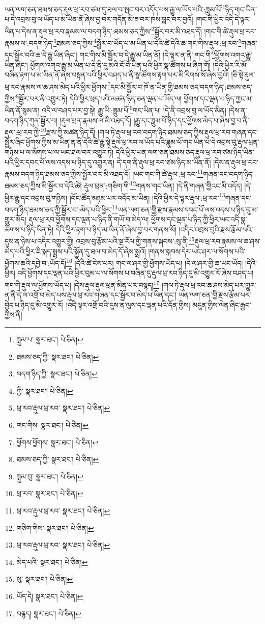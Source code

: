 ཡན་ལག་ཅན་ཐམས་ཅད་རྡུལ་ཕྲ་རབ་ཙམ་དུ་ཐལ་བ་སྤང་བར་འདོད་པས་རྒྱུ་ལ་ཡོད་པའི་:ཟླུམ་པོ་\footnote{ཟླུམ་པ་  སྣར་ཐང་།  པེ་ཅིན། }ཉིད་གང་ཡིན་པ་དེ་འབྲས་བུ་ལ་ཡོད་པ་མ་ཡིན་ནོ་ཞེས་བྱ་བར་གདོན་མི་ཟ་བར་ཁས་བླང་བར་བྱའོ། །གང་གི་ཕྱིར་འདི་དེ་ལྟར་ཡིན་པ་དེས་ན་རྡུལ་ཕྲ་རབ་རྣམས་ལ་བདག་ཉིད་:ཐམས་ཅད་ཀྱིས་\footnote{ཐམས་ཅད་ཀྱི་  སྣར་ཐང་།  པེ་ཅིན། }སྦྱོར་བར་མི་འཐད་དོ། །གང་གི་ཚེ་རྡུལ་ཕྲ་རབ་རྣམས་ལ་:བདག་ཉིད་\footnote{བདག་ཉིད་ཀྱི་  སྣར་ཐང་།  པེ་ཅིན། }ཐམས་ཅད་ཀྱིས་\footnote{ཀྱི་  སྣར་ཐང་།  པེ་ཅིན། }སྦྱོར་བ་ཡོད་པ་མ་ཡིན་པ་དེའི་ཚེ་དེའི་ཆ་གང་གིས་རྡུལ་:ཕྲ་རབ་\footnote{ཕྲ་རབ་རྡུལ་ཕྲ་རབ་  སྣར་ཐང་།  པེ་ཅིན། }གཞན་དང་སྦྱོར་བའི་ཆ་དེ་རྒྱུ་ཡིན་ཞིང་། གང་གིས་མི་སྦྱོར་བ་དེ་རྒྱུ་མ་ཡིན་ནོ། །དེ་ལྟར་ན་ནི་:གང་གི་\footnote{གང་གིས་  སྣར་ཐང་།  པེ་ཅིན། }ཕྱོགས་འགའ་རྒྱུ་ཡིན་ཞིང་། ཕྱོགས་འགའ་རྒྱུ་མ་ཡིན་པ་དེ་ནི་དུ་མའི་ངོ་བོ་ཡིན་པའི་ཕྱིར་སྣ་ཚོགས་པ་ཞིག་གོ། །དེའི་ཕྱིར་རི་མོ་བཞིན་རྟག་པ་མ་ཡིན་ནོ་ཞེས་བསྟན་པའི་ཕྱིར་བཤད་པ་ནི་སྣ་ཚོགས་རྟག་པར་མི་རིགས་སོ་ཞེས་བྱའོ། །ཅི་སྟེ་རྡུལ་ཕྲ་རབ་རྣམས་ལ་ཆ་ཤས་མེད་པའི་ཕྱིར་ཕྱོགས་\footnote{ཕྱོགས་ཕྱོགས་  སྣར་ཐང་།  པེ་ཅིན། }དང་མི་སྦྱོར་བ་ཁོ་ན་ཡིན་གྱི་ཐམས་ཅད་བདག་ཉིད་:ཐམས་ཅད་ཀྱིས་\footnote{ཐམས་ཅད་ཀྱི་  སྣར་ཐང་།  པེ་ཅིན། }སྦྱོར་བར་ནི་འགྱུར་ཏེ། དེའི་ཕྱིར་ཕྲད་པའི་མཚན་ཉིད་ཅན་ལྡན་པ་ཡོད་ལ། ཕྱོགས་དང་ལྡན་པ་ཉིད་ཀྱང་མ་ཡིན་ནོ་སྙམ་ན། འདི་ལ་བཤད་པར་བྱ་སྟེ། རྒྱུ་ཡི་:ཟླུམ་པོ་\footnote{ཟླུམ་བུ་  སྣར་ཐང་།  པེ་ཅིན། }གང་ཡིན་པ། །དེ་ནི་འབྲས་བུ་ལ་ཡོད་མིན། །དེས་ན་བདག་ཉིད་ཀུན་སྦྱོར་བ། །རྡུལ་ཕྲན་རྣམས་ལ་མི་འཐད་དོ། །རྒྱུ་དང་ཟླུམ་པོ་ཉིད་དང་ཕྱོགས་མེད་པ་ཞེས་བྱ་བ་ནི་རྡུལ་:ཕྲ་རབ་ཀྱི་\footnote{ཕྲ་རབ་  སྣར་ཐང་།  པེ་ཅིན། }རྫས་ཀྱི་མཚན་ཉིད་དོ། །གལ་ཏེ་རྡུལ་ཕྲ་རབ་བདག་ཉིད་ཐམས་ཅད་ཀྱིས་རྡུལ་ཕྲ་རབ་གཞན་དང་སྦྱོར་ཞིང་ཕྱོགས་ཀྱིས་མ་ཡིན་ན་ནི་དེའི་ཚེ་རྒྱུ་སྟེ་རྡུལ་ཕྲ་རབ་ལ་ཡོད་པའི་ཟླུམ་པོ་གང་ཡིན་པ་དེ་འབྲས་བུ་རྡུལ་ཕྲན་གཉིས་པ་ལ་སོགས་པ་ལ་ཡང་ཐལ་བར་འགྱུར་ཏེ། དེའི་ཕྱིར་ཡན་ལག་ཅན་ཐམས་ཅད་རྡུལ་ཕྲ་རབ་ཙམ་ཉིད་ཡིན་པའི་ཕྱིར་དབང་པོ་ལས་འདས་པ་ཉིད་དུ་འགྱུར་ན། དེ་དག་ནི་རྡུལ་ཕྲ་རབ་ཙམ་ཉིད་མ་ཡིན་ནོ། །དེས་ན་རྡུལ་ཕྲ་རབ་རྣམས་བདག་ཉིད་ཐམས་ཅད་ཀྱིས་སྦྱོར་བར་མི་འཐད་དོ། །ཡང་གང་གི་ཚེ་རྡུལ་:ཕྲ་རབ་\footnote{ཕྲ་རབ་རྡུལ་ཕྲ་རབ་  སྣར་ཐང་།  པེ་ཅིན། }གཞན་དང་བདག་ཉིད་ཐམས་ཅད་ཀྱིས་མི་སྦྱོར་བ་དེའི་ཚེ། རྡུལ་ཕྲན་:གཅིག་གི་\footnote{གཅིག་གིས་  སྣར་ཐང་།  པེ་ཅིན། }གནས་གང་ཡིན། །དེ་ནི་གཞན་གྱིའང་མི་འདོད། །དེ་ཕྱིར་རྒྱུ་དང་འབྲས་བུ་གཉིས། །བོང་ཚོད་མཉམ་པར་འདོད་མ་ཡིན། །དེའི་ཕྱིར་དེ་ལྟར་རྡུལ་:ཕྲ་རབ་\footnote{ཕྲ་རབ་རྡུལ་ཕྲ་རབ་  སྣར་ཐང་།  པེ་ཅིན། }གཞན་དང་བདག་ཉིད་ཐམས་ཅད་ཀྱི་སྦྱོར་བ་:མེད་པའི་ཕྱིར་\footnote{མེད་པའི་  སྣར་ཐང་།  པེ་ཅིན། }ཡན་ལག་ཅན་གྱི་རྫས་རྣམས་དབང་པོ་ལས་འདས་པ་ཉིད་དུ་མ་གྱུར་མོད། རྡུལ་ཕྲ་རབ་ཕྱོགས་དང་ལྡན་པ་ཉིད་ནི་གཡོ་བ་མེད་ལ། ཕྱོགས་དང་ལྡན་པ་ཉིད་ཀྱི་ཕྱིར་ཡང་འདི་སྣ་ཚོགས་པ་ཉིད་ཡིན་ཏེ། དེའི་ཕྱིར་རྟག་པ་ཉིད་མ་ཡིན་ནོ་ཞེས་བྱ་བར་གནས་སོ། །འདིར་འབྲས་བུའི་རྫས་རྩོམ་པའི་དུས་ན་ཉེས་པ་འདིར་འགྱུར་གྱི། འབྲས་བུ་རྩོམ་པའི་སྔ་རོལ་གྱི་གནས་སྐབས་:སུ་ནི་\footnote{སུ་  སྣར་ཐང་།  པེ་ཅིན། }རྡུལ་ཕྲ་རབ་རྣམས་ལ་ཆ་ཤས་མེད་པའི་ཕྱིར་ཇི་སྐད་སྨྲས་པའི་སྐྱོན་དུ་ཐལ་བ་མེད་དོ་ཞེས་སྨྲའོ། །གནས་སྐབས་དེར་ཡང་ཤར་ལ་སོགས་པའི་ཕྱོགས་ཆའི་དབྱེ་བ་:ཡོད་དོ།\footnote{ཡོད་དེ།  སྣར་ཐང་།  པེ་ཅིན། } །དེའི་ཚེ་ངེས་པར། གང་ལ་ཤར་གྱི་ཕྱོགས་ཡོད་པ། །དེ་ལ་ཤར་གྱི་ཆ་ཡང་ཡོད། །དེའི་ཕྱིར། འདི་ཕྱོགས་དང་ལྡན་པའི་ཕྱིར་བུམ་པ་ལ་སོགས་པ་བཞིན་དུ་རྡུལ་ཕྲ་རབ་ཉིད་དུ་མི་འགྱུར་རོ་ཞེས་བཤད་པ། གང་གི་རྡུལ་ལ་ཕྱོགས་ཡོད་པ། །དེས་རྡུལ་རྡུལ་ཕྲན་མིན་པར་བསྙད།\footnote{བརྙད།  སྣར་ཐང་།  པེ་ཅིན། } །གལ་ཏེ་རྡུལ་ཕྲ་རབ་ཆ་ཤས་མེད་པར་གྱུར་ན་ནི་དེ་ལ་འགྲོ་བ་མེད་པས་རྡུལ་ཕྲ་རབ་གཞན་དང་སྦྱོར་བ་མེད་པ་ཡིན་དང་། ཡན་ལག་ཅན་གྱི་རྫས་རྩོམ་པར་བྱེད་པ་ཉིད་དུ་མི་འགྱུར་རོ། །འདི་ལྟར་འགྲོ་བའི་དུས་ན་ལུས་དང་ལྡན་པའི་དོན་གྱིས། མདུན་གྱིས་ལེན་ཞིང་རྒྱབ་ཀྱིས་ནི། 